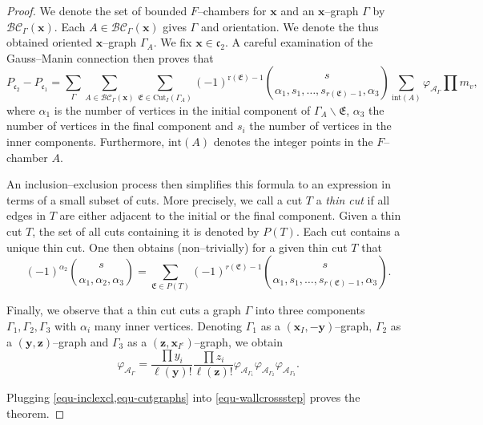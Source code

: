 \documentclass[10pt,a4paper,oneside,no-math,reqno]{amsart}%
\theoremstyle{plain}
\theoremstyle{definition}
\theoremstyle{remark}
\numberwithin{equation}{section}
\renewcommand{\phi}{\varphi}
\newcommand{\1}{\mathds{1}}
\newcommand{\<}{\langle}
\renewcommand{\>}{\rangle}
\begin{document}
\begin{proof}
    We denote the set of bounded $F$--chambers for $\mathbf{x}$ and an $\mathbf{x}$--graph $\Gamma$ by $\mathcal{BC}_{\Gamma}(\mathbf{x})$. Each $A\in\mathcal{BC}_\Gamma(\mathbf{x})$ gives $\Gamma$ and orientation. We denote the thus obtained oriented $\mathbf{x}$--graph $\Gamma_A$.
    We fix $\mathbf{x}\in\mathfrak{c}_2$. A careful examination of the Gauss--Manin connection then proves that
    \begin{equation}
    \label{equ-wallcrossstep}
        P_{\mathfrak{c}_2}-P_{\mathfrak{c}_1}
        =
        \sum_{\Gamma}\sum_{A\in\mathcal{BC}_{\Gamma}(\mathbf{x})}\sum_{\mathfrak{E}\in\mathrm{Cut}_I(\Gamma_A)}(-1)^{\mathrm{r}(\mathfrak{E})-1}\binom{s}{\alpha_1, s_1,\dots, s_{r(\mathfrak{E})-1},\alpha_3}\sum_{\mathrm{int}(A)}\phi_{\mathcal{A}_\Gamma}\prod m_v,
    \end{equation}
    where $\alpha_1$ is the number of vertices in the initial component of $\Gamma_A\backslash\mathfrak{E}$, $\alpha_3$ the number of vertices in the final component and $s_i$ the number of vertices in the inner components. Furthermore, $\mathrm{int}(A)$ denotes the integer points in the $F$--chamber $A$.

    
    An inclusion--exclusion process then simplifies this formula to an expression in terms of a small subset of cuts. More precisely, we call a cut $T$ a \emph{thin cut} if all edges in $T$ are either adjacent to the initial or the final component. Given a thin cut $T$, the set of all cuts containing it is denoted by $P(T)$. Each cut contains a unique thin cut. One then obtains (non--trivially) for a given thin cut $T$ that
    \begin{equation}
    \label{equ-inclexcl}
        (-1)^{\alpha_2}\binom{s}{\alpha_1,\alpha_2,\alpha_3}=\sum_{\mathfrak{E}\in P(T)} (-1)^{r(\mathfrak{E})-1}\binom{s}{\alpha_1, s_1,\dots ,s_{r(\mathfrak{E})-1},\alpha_3}.
    \end{equation}

    Finally, we observe that a thin cut cuts a graph $\Gamma$ into three components $\Gamma_1,\Gamma_2,\Gamma_3$ with $\alpha_i$ many inner vertices. Denoting $\Gamma_1$ as a $(\mathbf{x}_I,-\mathbf{y})$--graph, $\Gamma_2$ as a $(\mathbf{y},\mathbf{z})$--graph and $\Gamma_3$ as a $(\mathbf{z},\mathbf{x}_{I^c})$--graph, we obtain
    \begin{equation}
    \label{equ-cutgraphs}
        \phi_{\mathcal{A}_\Gamma}=\frac{\prod y_i}{\ell(\mathbf{y})!}\frac{\prod z_i}{\ell(\mathbf{z})!}\phi_{\mathcal{A}_{\Gamma_1}}\phi_{\mathcal{A}_{\Gamma_2}}\phi_{\mathcal{A}_{\Gamma_3}}.
    \end{equation}

    Plugging \cref{equ-inclexcl,equ-cutgraphs} into \cref{equ-wallcrossstep} proves the theorem.
\end{proof}
\end{document}
